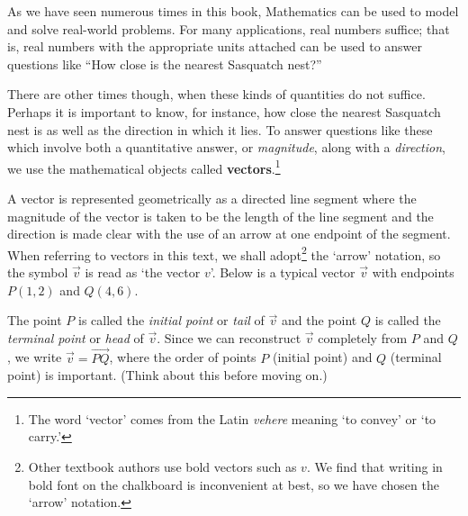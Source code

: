 \documentclass{ximera}
\begin{document}
	\author{Stitz-Zeager}




\setcounter{footnote}{0}

\label{Vectors}

As we have seen numerous times in this book, Mathematics can be used to model and solve real-world problems.  For many applications, real numbers suffice; that is, real numbers with the appropriate units attached can be used to answer questions like ``How close is the nearest Sasquatch nest?''   

\smallskip

There are other times though, when these kinds of quantities do not suffice.  Perhaps it is important to know, for instance, how close the nearest Sasquatch nest is as well as the direction in which it lies.  To answer questions like these which involve both a quantitative answer, or \textit{magnitude}, along with a \textit{direction}, we use the mathematical objects called \textbf{vectors}.\footnote{The word `vector' comes from the Latin \textit{vehere} meaning `to convey' or `to carry.'}    

\smallskip

A vector is represented geometrically as a directed line segment where the magnitude of the vector is taken to be the length of the line segment and the direction is made clear with the use of an arrow at one endpoint of the segment.   When referring to vectors in this text, we shall adopt\footnote{Other textbook authors use bold vectors such as \boldmath $v$.  We find that writing in bold font on the chalkboard is inconvenient at best, so we have chosen the `arrow' notation.} the `arrow' notation, so the symbol  $\vec{v}$ is read as `the vector $v$'. Below is a typical vector $\vec{v}$ with endpoints $P\left(1, 2\right)$ and $Q\left(4, 6\right)$. 

\smallskip

The point $P$  is called the \textit{initial point} or \textit{tail} of  $\vec{v}$ and the point $Q$ is called the \textit{terminal point} or \textit{head} of  $\vec{v}$.   Since we can reconstruct $\vec{v}$ completely from $P$ and $Q$, we write $\vec{v} = \overrightarrow{PQ}$, where the order of points $P$ (initial point) and $Q$ (terminal point) is important. (Think about this before moving on.)
\end{document}
